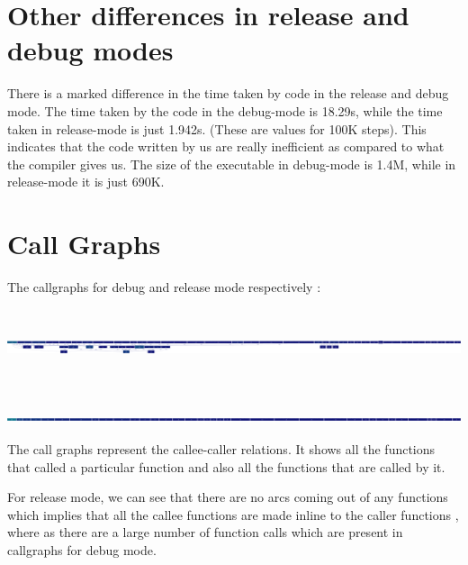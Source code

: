 \documentclass[english]{article}
\begin{document}
\section{Other differences in release and debug modes}
There is a marked difference in the time taken by code in the release and debug mode. The time taken by the code in the debug-mode is 18.29s, while the time taken in release-mode is just 1.942s. (These are values for 100K steps). This indicates that the code written by us are really inefficient as compared to what the compiler gives us.
\newline
The size of the executable in debug-mode is 1.4M, while in release-mode it is just 690K. 


\section{Call Graphs}
The callgraphs for debug and release mode respectively :
\newline
\includegraphics[width=20cm, height=3cm]{doc/debug.png}
\newline
\newline
\includegraphics[width=20cm, height=1cm]{doc/release.png}
\newline
The call graphs represent the callee-caller relations. It shows all the functions that called a particular function 
and also all the functions that are called by it.

For release mode, we can see that there are no arcs coming out of
any functions which implies that all the callee functions are made
inline to the caller functions , where as there are a large number
of function calls which are present in callgraphs for debug mode.
\end{document}

